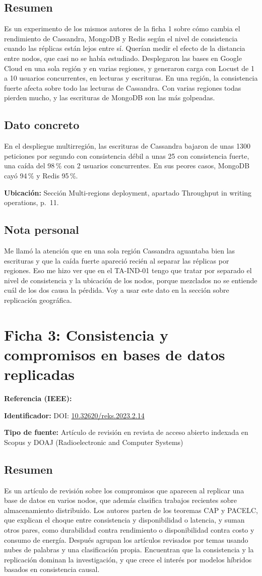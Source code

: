 \documentclass[11pt,a4paper]{article}
\newcommand{\campo}[2]{\noindent\textbf{#1:} #2\par\smallskip}
\newcommand{\ficha}[1]{\section*{#1}}
\newcommand{\parte}[1]{\subsection*{#1}}
\begin{document}
\parte{Resumen}
Es un experimento de los mismos autores de la ficha 1 sobre cómo cambia el rendimiento
de Cassandra, MongoDB y Redis según el nivel de consistencia cuando las réplicas están
lejos entre sí. Querían medir el efecto de la distancia entre nodos, que casi no se había
estudiado. Desplegaron las bases en Google Cloud en una sola región y en varias regiones,
y generaron carga con Locust de 1 a 10 usuarios concurrentes, en lecturas y escrituras. En
una región, la consistencia fuerte afecta sobre todo las lecturas de Cassandra. Con varias
regiones todas pierden mucho, y las escrituras de MongoDB son las más golpeadas.

\parte{Dato concreto}
En el despliegue multirregión, las escrituras de Cassandra bajaron de unas 1300 peticiones
por segundo con consistencia débil a unas 25 con consistencia fuerte, una caída del 98\,\%
con 2 usuarios concurrentes. En sus peores casos, MongoDB cayó 94\,\% y Redis 95\,\%.

\campo{Ubicación}{Sección Multi-regions deployment, apartado Throughput in writing
operations, p.~11.}

\parte{Nota personal}
Me llamó la atención que en una sola región Cassandra aguantaba bien las escrituras y que
la caída fuerte apareció recién al separar las réplicas por regiones. Eso me hizo ver que
en el TA-IND-01 tengo que tratar por separado el nivel de consistencia y la ubicación de
los nodos, porque mezclados no se entiende cuál de los dos causa la pérdida. Voy a usar
este dato en la sección sobre replicación geográfica.

\ficha{Ficha 3: Consistencia y compromisos en bases de datos replicadas}

\campo{Referencia (IEEE)}{}
\campo{Identificador}{DOI: \href{https://doi.org/10.32620/reks.2023.2.14}{10.32620/reks.2023.2.14}}
\campo{Tipo de fuente}{Artículo de revisión en revista de acceso abierto indexada en Scopus
y DOAJ (Radioelectronic and Computer Systems)}

\parte{Resumen}
Es un artículo de revisión sobre los compromisos que aparecen al replicar una base de
datos en varios nodos, que además clasifica trabajos recientes sobre almacenamiento
distribuido. Los autores parten de los teoremas CAP y PACELC, que explican el choque
entre consistencia y disponibilidad o latencia, y suman otros pares, como durabilidad
contra rendimiento o disponibilidad contra costo y consumo de energía. Después agrupan
los artículos revisados por temas usando nubes de palabras y una clasificación propia.
Encuentran que la consistencia y la replicación dominan la investigación, y que crece el
interés por modelos híbridos basados en consistencia causal.
\end{document}

